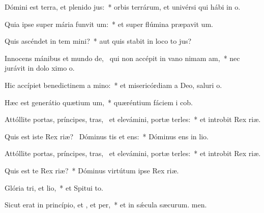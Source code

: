 \item Dómini est terra, et plenido jus:~* orbis terrárum, et univérsi qui hábi in o.
\item Quia ipse super mária funvit um:~* et super flúmina præpavit um.
\item Quis ascéndet in tem mini?~* aut quis stabit in loco to jus?
\item Innocens mánibus et mundo de,~\pscross{} qui non accépit in vano nimam am,~* nec jurávit in dolo ximo o.
\item Hic accípiet benedictinem a mino:~* et misericórdiam a Deo, saluri o.
\item Hæc est generátio quætium um,~* quæréntium fáciem i cob.
\item Attóllite portas, príncipes, tras,~\pscross{} et elevámini, portæ terles:~* et introbit Rex riæ.
\item Quis est iste Rex riæ?~\pscross{} Dóminus tis et ens:~* Dóminus ens in lio.
\item Attóllite portas, príncipes, tras,~\pscross{} et elevámini, portæ terles:~* et introbit Rex riæ.
\item Quis est te Rex riæ?~* Dóminus virtútum ipse  Rex riæ.
\item Glória tri, et lio,~* et Spitui to.
\item Sicut erat in princípio, et , et per,~* et in sǽcula sæcurum. men.
